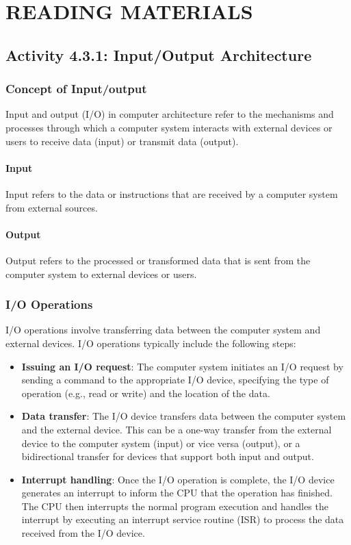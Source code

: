 \documentclass[12pt,a4paper]{article}
\begin{document}
\section*{READING MATERIALS}

\subsection*{Activity 4.3.1: Input/Output Architecture}

\subsubsection*{Concept of Input/output}
Input and output (I/O) in computer architecture refer to the mechanisms and processes through which a computer system interacts with external devices or users to receive data (input) or transmit data (output).

\paragraph{Input}
Input refers to the data or instructions that are received by a computer system from external sources.

\paragraph{Output}
Output refers to the processed or transformed data that is sent from the computer system to external devices or users.

\subsubsection*{I/O Operations}
I/O operations involve transferring data between the computer system and external devices. I/O operations typically include the following steps:
\begin{itemize}
    \item \textbf{Issuing an I/O request}: The computer system initiates an I/O request by sending a command to the appropriate I/O device, specifying the type of operation (e.g., read or write) and the location of the data.
    \item \textbf{Data transfer}: The I/O device transfers data between the computer system and the external device. This can be a one-way transfer from the external device to the computer system (input) or vice versa (output), or a bidirectional transfer for devices that support both input and output.
    \item \textbf{Interrupt handling}: Once the I/O operation is complete, the I/O device generates an interrupt to inform the CPU that the operation has finished. The CPU then interrupts the normal program execution and handles the interrupt by executing an interrupt service routine (ISR) to process the data received from the I/O device.
\end{itemize}
\end{document}
